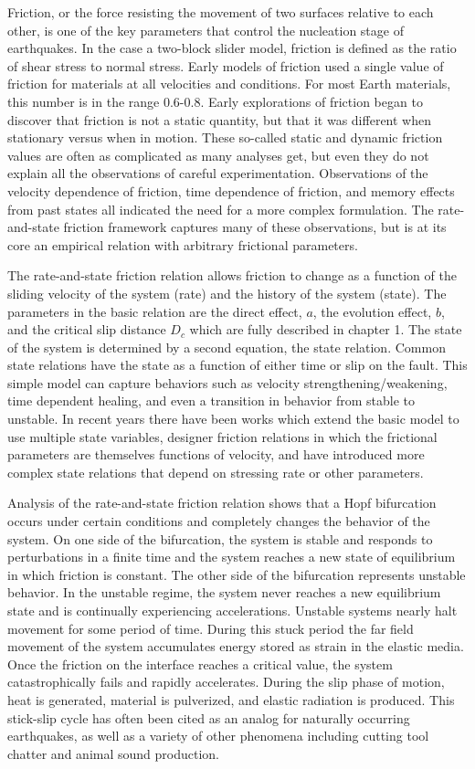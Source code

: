 Friction, or the force resisting the movement of two surfaces relative to each other, is one of the key parameters that control the nucleation stage of earthquakes. In the case a two-block slider model, friction is defined as the ratio of shear stress to normal stress. Early models of friction used a single value of friction for materials at all velocities and conditions. For most Earth materials, this number is in the range 0.6-0.8. Early explorations of friction began to discover that friction is not a static quantity, but that it was different when stationary versus when in motion. These so-called static and dynamic friction values are often as complicated as many analyses get, but even they do not explain all the observations of careful experimentation. Observations of the velocity dependence of friction, time dependence of friction, and memory effects from past states all indicated the need for a more complex formulation. The rate-and-state friction framework captures many of these observations, but is at its core an empirical relation with arbitrary frictional parameters.

The rate-and-state friction relation allows friction to change as a function of the sliding velocity of the system (rate) and the history of the system (state). The parameters in the basic relation are the direct effect, $a$, the evolution effect, $b$, and the critical slip distance $D_c$ which are fully described in chapter 1. The state of the system is determined by a second equation, the state relation. Common state relations have the state as a function of either time or slip on the fault. This simple model can capture behaviors such as velocity strengthening/weakening, time dependent healing, and even a transition in behavior from stable to unstable. In recent years there have been works which extend the basic model to use multiple state variables, designer friction relations in which the frictional parameters are themselves functions of velocity, and have introduced more complex state relations that depend on stressing rate or other parameters.

Analysis of the rate-and-state friction relation shows that a Hopf bifurcation occurs under certain conditions and completely changes the behavior of the system. On one side of the bifurcation, the system is stable and responds to perturbations in a finite time and the system reaches a new state of equilibrium in which friction is constant. The other side of the bifurcation represents unstable behavior. In the unstable regime, the system never reaches a new equilibrium state and is continually experiencing accelerations. Unstable systems nearly halt movement for some period of time. During this stuck period the far field movement of the system accumulates energy stored as strain in the elastic media. Once the friction on the interface reaches a critical value, the system catastrophically fails and rapidly accelerates. During the slip phase of motion, heat is generated, material is pulverized, and elastic radiation is produced. This stick-slip cycle has often been cited as an analog for naturally occurring earthquakes, as well as a variety of other phenomena including cutting tool chatter and animal sound production.

